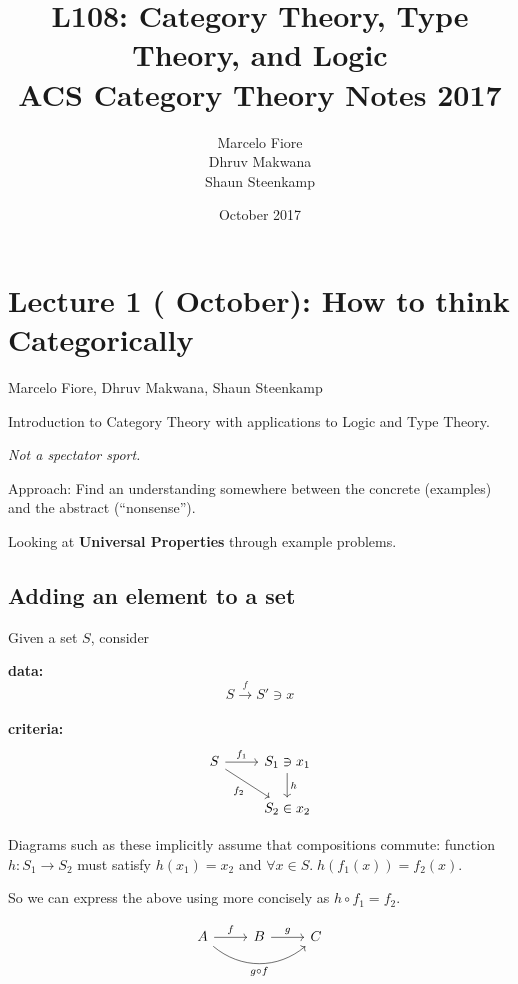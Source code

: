 \documentclass[a4paper, 12pt]{article}
\title{L108: Category Theory, Type Theory, and Logic\\
  ACS Category Theory Notes 2017}
\date{\nth{5} October 2017}
\author{Marcelo Fiore\\ Dhruv Makwana\\ Shaun Steenkamp}
\theoremstyle{definition}
\begin{document}
\maketitle

\tableofcontents

\newpage
\section{Lecture 1 ( October): How to think Categorically}
\vspace*{-5mm}\hspace*{7.75mm}
Marcelo Fiore, Dhruv Makwana, Shaun Steenkamp
\bigskip

Introduction to Category Theory with applications to Logic and Type Theory.

\emph{Not a spectator sport.}

Approach: Find an understanding somewhere between the concrete (examples) and
the abstract (``nonsense'').

Looking at \textbf{Universal Properties} through example problems.

\subsection{Adding an element to a set}

Given a set $S$, consider

\textbf{data:} $$ S \overset{f}{\rightarrow} S' \ni x $$ \\
\textbf{criteria:} $$
    \begin{tikzcd}
        S \arrow[r, "f_1"]
          \arrow[dr, swap, "f_2"]
          &
        S_1 \ni x_1 \arrow[d, "h"]
          \\
          {}&
        S_2 \in x_2
    \end{tikzcd}
$$

\begin{framed}
Diagrams such as these implicitly assume that compositions commute:
function $h : S_1 \rightarrow S_2$ must satisfy $h(x_1) = x_2$ and $\forall x
\in S .\; h(f_1(x)) = f_2(x)$.

So we can express the above using more concisely as $h \circ f_1 = f_2$.

$$
\begin{tikzcd}
    A \arrow[r, "f"] \arrow[rr, swap, bend right=40, "g \circ f"] & B \arrow[r, "g"] & C
\end{tikzcd}
$$

\end{framed}
\end{document}
